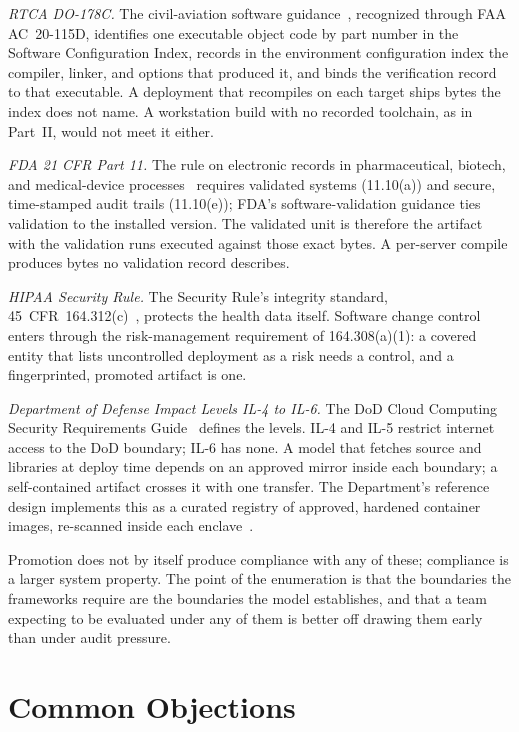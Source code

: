 \documentclass[11pt]{article}
\begin{document}
\textit{RTCA DO-178C.} The civil-aviation software guidance~\cite{DO178C}, recognized through FAA AC~20-115D, identifies one executable object code by part number in the Software Configuration Index, records in the environment configuration index the compiler, linker, and options that produced it, and binds the verification record to that executable. A deployment that recompiles on each target ships bytes the index does not name. A workstation build with no recorded toolchain, as in Part~II, would not meet it either.

\textit{FDA 21 CFR Part 11.} The rule on electronic records in pharmaceutical, biotech, and medical-device processes~\cite{Part11} requires validated systems (11.10(a)) and secure, time-stamped audit trails (11.10(e)); FDA's software-validation guidance ties validation to the installed version. The validated unit is therefore the artifact with the validation runs executed against those exact bytes. A per-server compile produces bytes no validation record describes.

\textit{HIPAA Security Rule.} The Security Rule's integrity standard, 45~CFR~164.312(c)~\cite{HIPAA}, protects the health data itself. Software change control enters through the risk-management requirement of 164.308(a)(1): a covered entity that lists uncontrolled deployment as a risk needs a control, and a fingerprinted, promoted artifact is one.

\textit{Department of Defense Impact Levels IL-4 to IL-6.} The DoD Cloud Computing Security Requirements Guide~\cite{CCSRG} defines the levels. IL-4 and IL-5 restrict internet access to the DoD boundary; IL-6 has none. A model that fetches source and libraries at deploy time depends on an approved mirror inside each boundary; a self-contained artifact crosses it with one transfer. The Department's reference design implements this as a curated registry of approved, hardened container images, re-scanned inside each enclave~\cite{DoDDevSecOps}.

Promotion does not by itself produce compliance with any of these; compliance is a larger system property. The point of the enumeration is that the boundaries the frameworks require are the boundaries the model establishes, and that a team expecting to be evaluated under any of them is better off drawing them early than under audit pressure.

\section{Common Objections}
\end{document}
